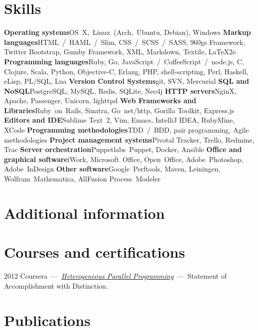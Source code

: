 \documentclass[12pt,a4paper,final]{moderncv}
\begin{document}
\section{Skills}
\cvcomputer
{\textbf{Operating systems}}{OS~X,~Linux~(Arch,~Ubuntu, Debian), Windows}
{\textbf{Markup languages}}{HTML~/~HAML~/~Slim, CSS~/~SCSS~/~SASS, 960gs Framework, Twitter Bootstrap, Gumby Framework, XML, Markdown, Textile, \LaTeX2e}
%
\cvcomputer
{\textbf{Programming languages}}{Ruby, Go, JavaScript~/~CoffeeScript~/~node.js, C, Clojure, Scala, Python, Objective-C, Erlang, PHP, shell-scripting, Perl, Haskell, eLisp, PL/SQL, Lua}
{\textbf{Version Control Systems}}{git, SVN, Mercurial}
%
\cvcomputer
{\textbf{SQL and NoSQL}}{PostgreSQL, MySQL, Redis, SQLite, Neo4j}
{\textbf{HTTP servers}}{NginX, Apache, Passenger, Unicorn, lighttpd}
%
\cvcomputer
{\textbf{Web Frameworks and Libraries}}{Ruby~on~Rails, Sinatra, Go~net/http, Gorilla Toolkit, Express.js}
{\textbf{Editors and IDE}}{Sublime Text~2, Vim, Emacs, IntelliJ IDEA, RubyMine, XCode}
%
\cvcomputer
{\textbf{Programming methodologies}}{TDD~/~BDD, pair programming, Agile methodologies}
{\textbf{Project management systems}}{Pivotal Tracker, Trello, Redmine, Trac}
%
\cvcomputer
{\textbf{Server orchestration}}{Puppetlabs~Puppet, Docker, Ansible}
{\textbf{Office and graphical software}}{iWork, Microsoft~Office, Open~Office, Adobe~Photoshop, Adobe~InDesign}
%
\cvcomputer
{\textbf{Other software}}{Google~Perftools, Maven, Leiningen, Wolfram~Mathematica, AllFusion Process~Modeler}{}{}

\section{Additional information}
%
%

\section{Courses and certifications}
\cvline
{2012}
{Coursera~---~\underline{\href{https://www.coursera.org/course/hetero}{\itshape Heterogeneous Parallel Programming}}~---~Statement of Accomplishment with Distinction.}%

\section{Publications}
%
\end{document}
